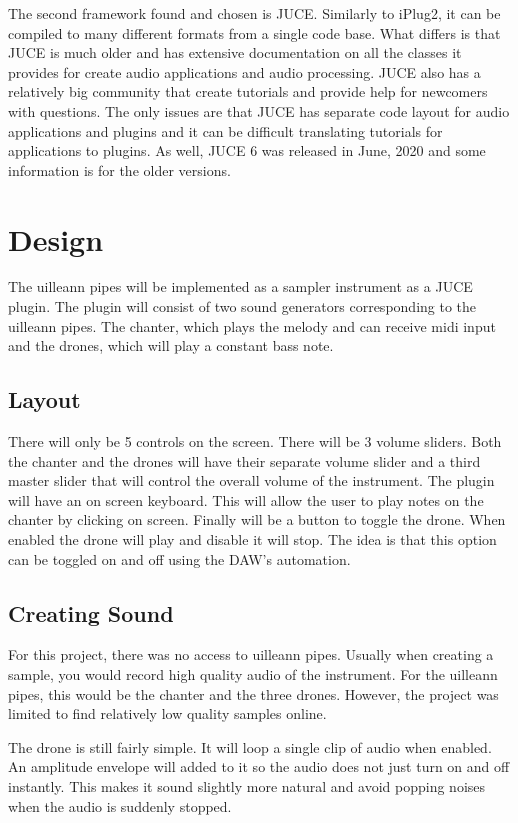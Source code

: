 \documentclass[12pt]{article}
\begin{document}
	The second framework found and chosen is JUCE. Similarly to iPlug2, it can be compiled to many different formats from a 
	single code base. What differs is that JUCE is much older and has extensive documentation on all the classes it provides
	for create audio applications and audio processing. JUCE also has a relatively big community that create tutorials and provide
	help for newcomers with questions. The only issues are that JUCE has separate code layout for audio applications and plugins
	and it can be difficult translating tutorials for applications to plugins. As well, JUCE 6 was released in June, 2020 and 
	some information is for the older versions.
	
		
\section{Design}
	The uilleann pipes will be implemented as a sampler instrument as a JUCE plugin. The plugin will consist of two sound 
	generators corresponding to the uilleann pipes. The chanter, which plays the melody and can receive midi input and the
	drones, which will play a constant bass note.
	
	\subsection{Layout}
	There will only be 5 controls on the screen. There will be 3 volume sliders. Both the chanter and the drones will have their
	separate volume slider and a third master slider that will control the overall volume of the instrument.
	The plugin will have an on screen keyboard. This will allow the user to play notes on the chanter by clicking on screen.
	Finally will be a button to toggle the drone. When enabled the drone will play and disable it will stop. The idea is that
	this option can be toggled on and off using the DAW's automation.
	
	\subsection{Creating Sound}		
	For this project, there was no access to uilleann pipes. Usually when creating a sample, you would record high quality audio
	of the instrument. For the uilleann pipes, this would be the chanter and the three drones. However, the project was limited to
	find relatively low quality samples online.
	
	The drone is still fairly simple. It will loop a single clip of audio when enabled. An amplitude envelope will added to it so
	the audio does not just turn on and off instantly. This makes it sound slightly more natural and avoid popping noises when 
	the audio is suddenly stopped.
	
\end{document}
